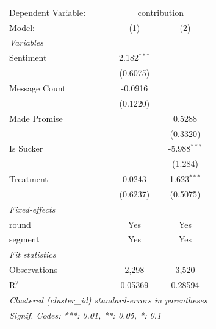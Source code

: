 
\begingroup
\centering
\begin{tabular}{lcc}
   \tabularnewline \midrule \midrule
   Dependent Variable: & \multicolumn{2}{c}{contribution}\\
   Model:        & (1)           & (2)\\  
   \midrule
   \emph{Variables}\\
   Sentiment     & 2.182$^{***}$ &   \\   
                 & (0.6075)      &   \\   
   Message Count & -0.0916       &   \\   
                 & (0.1220)      &   \\    
   Made Promise  &               & 0.5288\\   
                 &               & (0.3320)\\   
   Is Sucker     &               & -5.988$^{***}$\\   
                 &               & (1.284)\\   
    Treatment     & 0.0243        & 1.623$^{***}$\\   
                 & (0.6237)      & (0.5075)\\  
    \midrule
   \emph{Fixed-effects}\\
   round         & Yes           & Yes\\  
   segment       & Yes           & Yes\\  
   \midrule
   \emph{Fit statistics}\\
   Observations  & 2,298         & 3,520\\  
   R$^2$         & 0.05369       & 0.28594\\  
   \midrule \midrule
   \multicolumn{3}{l}{\emph{Clustered (cluster\_id) standard-errors in parentheses}}\\
   \multicolumn{3}{l}{\emph{Signif. Codes: ***: 0.01, **: 0.05, *: 0.1}}\\
\end{tabular}
\par\endgroup


